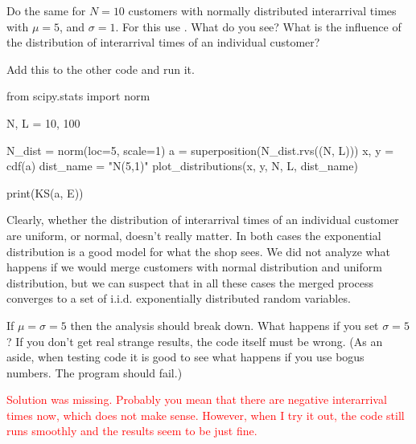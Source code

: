 \documentclass{scrartcl}
\newcommand{\notet}[1]{\textcolor{red}{#1}}
\begin{document}
\begin{exercise}
Do the same for $N=10$ customers with normally distributed interarrival times with $\mu=5$, and $\sigma =1$.
For this use . What do you see? What is the influence of the distribution of interarrival times of an individual customer? 
\begin{solution}
Add this to the other code and run it. 
\begin{pyverbatim}
from scipy.stats import norm

N, L = 10, 100

N_dist = norm(loc=5, scale=1)
a = superposition(N_dist.rvs((N, L)))
x, y = cdf(a)
dist_name = "N(5,1)"
plot_distributions(x, y, N, L, dist_name)

print(KS(a, E))
\end{pyverbatim}

Clearly, whether the distribution of interarrival times of an individual customer are uniform, or normal, doesn't really matter. In both cases the exponential distribution is a good model for what the shop sees. We did not analyze what happens if we would merge customers with normal distribution and uniform distribution, but we can suspect that in all these cases the merged process converges to a set of i.i.d. exponentially distributed random variables.

\end{solution}
\end{exercise}

\begin{exercise}
If  $\mu=\sigma=5$ then the analysis should break down. What happens if you set $\sigma=5$? If you don't get real strange results, the code itself must be wrong. (As an aside, when testing code it is good to see what happens if you use bogus numbers. The program should fail.)
\begin{solution}
	\notet{Solution was missing. Probably you mean that there are negative interarrival times now, which does not make sense. However, when I try it out, the code still runs smoothly and the results seem to be just fine.}
\end{solution}	
\end{exercise}
\end{document}
